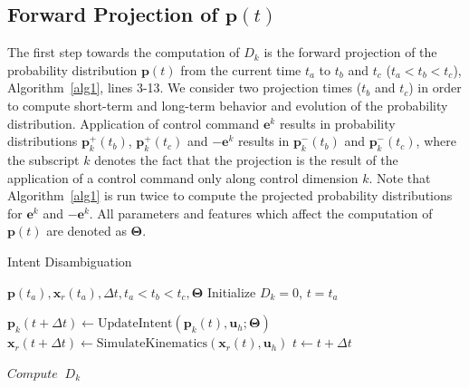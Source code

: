 \documentclass[natbib, twocolumn]{svjour3}          %
\begin{document}
\subsection{Forward Projection of $\boldsymbol{p}(t)$}\label{ssec:projection}
The first step towards the computation of $D_k$ is the forward projection of the probability distribution $\boldsymbol{p}(t)$ from the current time $t_a$ to $t_b$ and $t_c$ ($t_a < t_b < t_c$), Algorithm~\ref{alg1}, lines 3-13. We consider two projection times ($t_b$ and $t_c$) in order to compute short-term and long-term behavior and evolution of the probability distribution. Application of control command $\boldsymbol{e}^k$ results in probability distributions $\boldsymbol{p}^+_k(t_b)$, $\boldsymbol{p}^+_k(t_c)$ and $-\boldsymbol{e}^k$ results in $\boldsymbol{p}^-_k(t_b)$ and $\boldsymbol{p}^-_k(t_c)$, where the subscript $k$ denotes the fact that the projection is the result of the application of a control command only along control dimension $k$. Note that Algorithm~\ref{alg1} is run twice to compute the projected probability distributions for $\boldsymbol{e}^k$ and $-\boldsymbol{e}^k$. All parameters and features which affect the computation of $\boldsymbol{p}(t)$ are denoted as $\boldsymbol{\Theta}$. 

\begin{algorithm}[t]
	\caption{Intent Disambiguation}
	\label{alg1}
	\begin{algorithmic}[1]
		\REQUIRE $\boldsymbol{p}(t_a), \boldsymbol{x}_r(t_a), \Delta t, t_a < t_b < t_c, \boldsymbol{\Theta}$
		\STATE Initialize $D_k = 0$, $t = t_a$

			\STATE $\boldsymbol{p}_k(t + \Delta t) \leftarrow \text{UpdateIntent}(\boldsymbol{p}_k(t), \boldsymbol{u}_h; \boldsymbol{\Theta})$
			\STATE $\boldsymbol{x}_r(t + \Delta t) \leftarrow \text{SimulateKinematics}(\boldsymbol{x}_r(t), \boldsymbol{u}_h)$
			  
			\ENDIF
			  \ENDIF
			\STATE $t \leftarrow t + \Delta t$
		\ENDWHILE

		\STATE $Compute \;\;D_k$
		\ENDFOR
		
	\end{algorithmic}
\end{algorithm}
\end{document}
